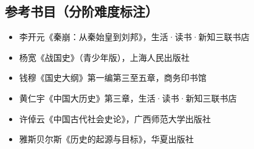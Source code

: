 \documentclass[a4paper,12pt]{ctexart}
\begin{document}
\subsection*{参考书目（分阶难度标注）}

\begin{itemize}
  \item [★] 李开元《秦崩：从秦始皇到刘邦》，生活·读书·新知三联书店
  \item [★] 杨宽《战国史》（青少年版），上海人民出版社
  \item [★★] 钱穆《国史大纲》第一编第三至五章，商务印书馆
  \item [★★] 黄仁宇《中国大历史》第三章，生活·读书·新知三联书店
  \item [★★★] 许倬云《中国古代社会史论》，广西师范大学出版社
  \item [★★★] 雅斯贝尔斯《历史的起源与目标》，华夏出版社
\end{itemize}
\end{document}
